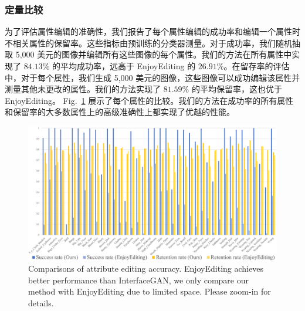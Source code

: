 \subsubsection{定量比较}
为了评估属性编辑的准确性，我们报告了每个属性编辑的成功率和编辑一个属性时不相关属性的保留率。这些指标由预训练的分类器测量。对于成功率，我们随机抽取 5,000 美元的图像并编辑所有这些图像的每个属性。我们的方法在所有属性中实现了 $84.13\%$ 的平均成功率，远高于 En​​joyEditing 的 $26.91\%$。在留存率的评估中，对于每个属性，我们生成 5,000 美元的图像，这些图像可以成功编辑该属性并测量其他未更改的属性。我们的方法实现了 $81.59\%$ 的平均保留率，这也优于EnjoyEditing。 Fig.~\ref{fig:zhuzhuang} 展示了每个属性的比较。我们的方法在成功率的所有属性和保留率的大多数属性上的高级准确性上都实现了优越的性能。

\begin{figure}[!t]
    \begin{center}
         \includegraphics[width=1\linewidth]{figures/ACGAN/excel_zhuzhuang.pdf}
    \end{center}
    \caption{Comparisons of attribute editing accuracy. EnjoyEditing achieves better performance than InterfaceGAN, we only compare our method with EnjoyEditing due to limited space. Please zoom-in for details.}
    \label{fig:zhuzhuang}
\end{figure}

